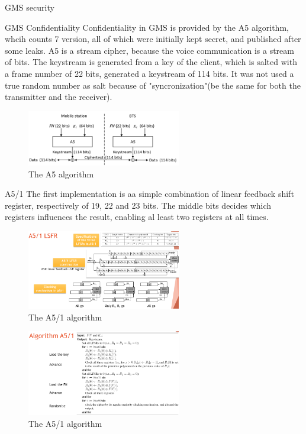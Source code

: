 \begin{section}{GMS security}
    \begin{subsection}{GMS Confidentiality}
      Confidentiality in GMS is provided by the A5 algorithm, whcih counts 7 version, all of which
      were initially kept secret, and published after some leaks. A5 is a stream cipher, because the
      voice communication is a stream of bits. The keystream is generated from a key of the client,
      which is salted with a frame number of 22 bits, generated a keystream of 114 bits. It was not
      used a true random number as salt because of "syncronization"(be the same for both the 
      transmitter and the receiver).
      \begin{figure}[h]
        \centering
        \includegraphics[width=0.6\textwidth]{img/wireless/a5.png}
        \caption{The A5 algorithm}
      \end{figure}
      \begin{subsubsection}{A5/1}
        The first implementation is aa simple combination of linear feedback shift register,
        respectively of 19, 22 and 23 bits. The middle bits decides which registers influences the
        result, enabling al least two registers at all times.

        \begin{figure}[H]
          \centering
          \includegraphics[width=0.6\textwidth]{img/wireless/a5-1.png}
          \caption{The A5/1 algorithm}
        \end{figure}

        \begin{figure}[H]
          \centering
          \includegraphics[width=0.6\textwidth]{img/wireless/a5-1 algorithm.png}
          \caption{The A5/1 algorithm}
        \end{figure}


\end{subsubsection}
\end{subsection}
\end{section}
